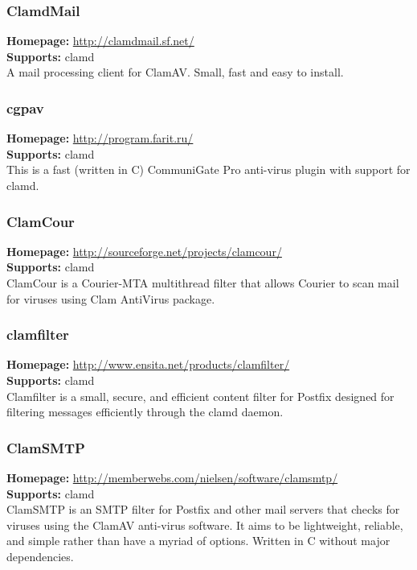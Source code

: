 \documentclass[a4paper,titlepage,12pt]{article}
\begin{document}
    \subsubsection{ClamdMail}
    \textbf{Homepage:} \url{http://clamdmail.sf.net/}\\
    \textbf{Supports:} clamd\\[4pt]
    A mail processing client for ClamAV. Small, fast and easy to install.

    \subsubsection{cgpav}
    \textbf{Homepage:} \url{http://program.farit.ru/}\\
    \textbf{Supports:} clamd\\[4pt]
    This is a fast (written in C) CommuniGate Pro anti-virus plugin with
    support for clamd.

    \subsubsection{ClamCour}
    \textbf{Homepage:} \url{http://sourceforge.net/projects/clamcour/}\\
    \textbf{Supports:} clamd\\[4pt]
    ClamCour is a Courier-MTA multithread filter that allows Courier to scan
    mail for viruses using Clam AntiVirus package.

    \subsubsection{clamfilter}
    \textbf{Homepage:} \url{http://www.ensita.net/products/clamfilter/}\\
    \textbf{Supports:} clamd\\[4pt]
    Clamfilter is a small, secure, and efficient content filter for Postfix
    designed for filtering messages efficiently through the clamd daemon.

    \subsubsection{ClamSMTP}
    \textbf{Homepage:} \url{http://memberwebs.com/nielsen/software/clamsmtp/}\\
    \textbf{Supports:} clamd \\[4pt]
    ClamSMTP is an SMTP filter for Postfix and other mail servers that checks
    for viruses using the ClamAV anti-virus software. It aims to be lightweight,
    reliable, and simple rather than have a myriad of options. Written in C
    without major dependencies.
\end{document}

